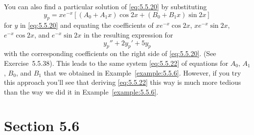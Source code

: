 \begin{examplesolution}
You can also find a particular solution of \eqref{eq:5.5.20} by substituting
\[
  y_{p}=xe^{-x}\left[(A_{0}+A_{1}x)\cos2x+(B_{0}+B_{1}x)\sin2x\right]
\]
for $y$ in \eqref{eq:5.5.20} and equating the coefficients of $xe^{-x}\cos2x$, $xe^{-x}\sin2x$,
$e^{-x}\cos2x$, and $e^{-x}\sin2x$ in the resulting expression for
\[
  y_{p}''+2y_{p}'+5y_{p}
\]
with the corresponding coefficients on the right side of \eqref{eq:5.5.20}. (See
Exercise~5.5.38). This leads to the same system \eqref{eq:5.5.22} of equations for
$A_{0}$, $A_{1}$, $B_{0}$, and $B_{1}$ that we obtained in Example~\ref{example:5.5.6}. However, if
you try this approach you'll see that deriving \eqref{eq:5.5.22} this way is much more tedious than
the way we did it in Example~\ref{example:5.5.6}.
\end{examplesolution}

\section*{Section 5.6}
\setcounter{chapter}{5}
\setcounter{section}{6}

